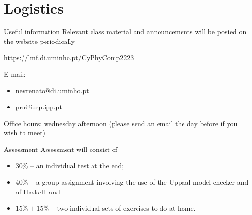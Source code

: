 \documentclass[aspectratio=169]{beamer}
\begin{document}
\section{Logistics}

\begin{frame}{Useful information}
  Relevant class material and announcements will be posted on the website periodically

  \url{https://lmf.di.uminho.pt/CyPhyComp2223}


  E-mail:
    \begin{itemize}
      \item \href{mailto:nevrenato@di.uminho.pt}{nevrenato@di.uminho.pt}
      \item \href{mailto:pro@isep.ipp.pt}{pro@isep.ipp.pt} 
    \end{itemize}
           

  Office hours: wednesday afternoon (please send an email the day before if you wish to meet)
\end{frame}

\begin{frame}{Assessment}
  Assessment will consist of
  \begin{itemize}
  \item 30\% -- an individual test at the end;
  \item 40\% -- a group assignment involving the use of the Uppaal model checker and of Haskell; and %
  \item $15\%+15\%$ -- two individual sets of exercises to do at home.
  \end{itemize}
\end{frame}
\end{document}
